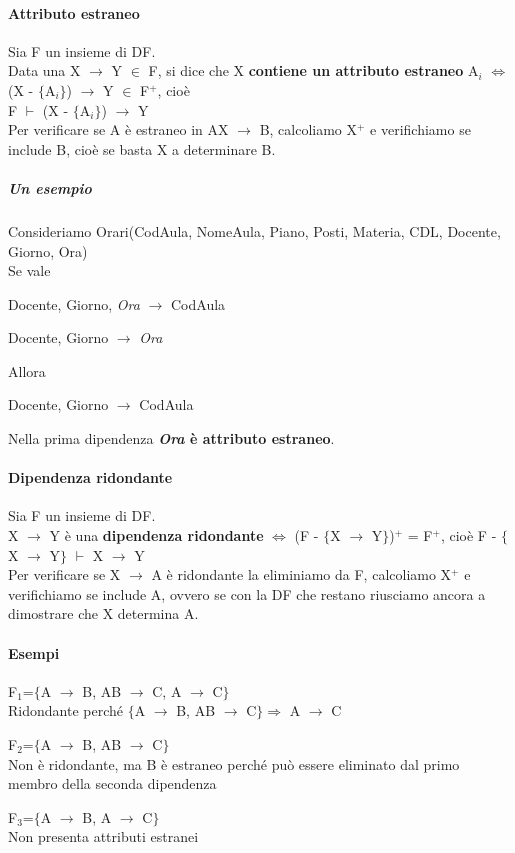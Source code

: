 \documentclass[10pt]{book}
\begin{document}
\paragraph{Attributo estraneo} Sia F un insieme di DF.\\
Data una X $\rightarrow$ Y $\in$ F, si dice che X \textbf{contiene un attributo estraneo} A$_i$ $\Leftrightarrow$ (X - $\{$A$_i\}$) $\rightarrow$ Y $\in$ F$^+$, cioè\\F $\vdash$ (X - $\{$A$_i\}$) $\rightarrow$ Y\\
Per verificare se A è estraneo in AX $\rightarrow$ B, calcoliamo X$^+$ e verifichiamo se include B, cioè se basta X a determinare B.
\subparagraph{Un esempio} Consideriamo Orari(CodAula, NomeAula, Piano, Posti, Materia, CDL, Docente, Giorno, Ora)\\
Se vale \begin{list}{}{}
	\item Docente, Giorno, \textit{Ora} $\rightarrow$ CodAula
	\item Docente, Giorno $\rightarrow$ \textit{Ora}
\end{list}
Allora \begin{list}{}{}
	\item Docente, Giorno $\rightarrow$ CodAula
\end{list}
Nella prima dipendenza \textbf{\textit{Ora} è attributo estraneo}.
\paragraph{Dipendenza ridondante} Sia F un insieme di DF.\\
X $\rightarrow$ Y è una \textbf{dipendenza ridondante} $\Leftrightarrow$ (F - $\{$X $\rightarrow$ Y$\}$)$^+$ = F$^+$, cioè F - $\{$X $\rightarrow$ Y$\}$ $\vdash$ X $\rightarrow$ Y\\
Per verificare se X $\rightarrow$ A è ridondante la eliminiamo da F, calcoliamo X$^+$ e verifichiamo se include A, ovvero se con la DF che restano riusciamo ancora a dimostrare che X determina A.
\paragraph{Esempi}
\begin{list}{}{}
	\item F$_1$=$\{$A $\rightarrow$ B, AB $\rightarrow$ C, A $\rightarrow$ C$\}$\\
	Ridondante perché $\{$A $\rightarrow$ B, AB $\rightarrow$ C$\}\Rightarrow$ A $\rightarrow$ C
	\item F$_2$=$\{$A $\rightarrow$ B, AB $\rightarrow$ C$\}$\\
	Non è ridondante, ma B è estraneo perché può essere eliminato dal primo membro della seconda dipendenza
	\item F$_3$=$\{$A $\rightarrow$ B, A $\rightarrow$ C$\}$\\
	Non presenta attributi estranei
\end{list}
\end{document}
